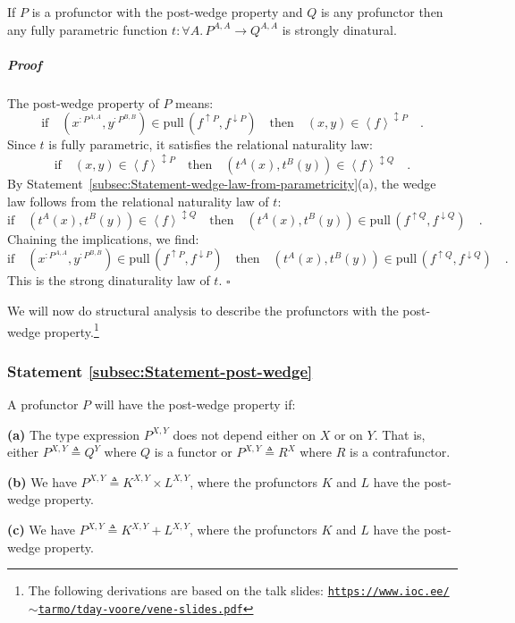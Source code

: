 If $P$ is a profunctor with the post-wedge property and $Q$ is any
profunctor then any fully parametric function $t:\forall A.\,P^{A,A}\rightarrow Q^{A,A}$
is strongly dinatural.

\subparagraph{Proof}

The post-wedge property of $P$ means:
\[
\text{if}\quad(x^{:P^{A,A}},y^{:P^{B,B}})\in\text{pull}\,(f^{\uparrow P},f^{\downarrow P})\quad\text{then}\quad(x,y)\in\left<f\right>^{\updownarrow P}\quad.
\]
Since $t$ is fully parametric, it satisfies the relational naturality
law:
\[
\text{if}\quad(x,y)\in\left<f\right>^{\updownarrow P}\quad\text{then}\quad(t^{A}(x),t^{B}(y))\in\left<f\right>^{\updownarrow Q}\quad.
\]
By Statement~\ref{subsec:Statement-wedge-law-from-parametricity}(a),
the wedge law follows from the relational naturality law of $t$:
\[
\text{if}\quad(t^{A}(x),t^{B}(y))\in\left<f\right>^{\updownarrow Q}\quad\text{then}\quad(t^{A}(x),t^{B}(y))\in\text{pull}\,(f^{\uparrow Q},f^{\downarrow Q})\quad.
\]
Chaining the implications, we find:
\[
\text{if}\quad(x^{:P^{A,A}},y^{:P^{B,B}})\in\text{pull}\,(f^{\uparrow P},f^{\downarrow P})\quad\text{then}\quad(t^{A}(x),t^{B}(y))\in\text{pull}\,(f^{\uparrow Q},f^{\downarrow Q})\quad.
\]
This is the strong dinaturality law of $t$. $\square$

We will now do structural analysis to describe the profunctors with
the post-wedge property.\footnote{The following derivations are based on the talk slides: \texttt{\href{https://www.ioc.ee/~tarmo/tday-voore/vene-slides.pdf}{https://www.ioc.ee/$\sim$tarmo/tday-voore/vene-slides.pdf}}} 

\subsubsection{Statement \label{subsec:Statement-post-wedge}\ref{subsec:Statement-post-wedge}}

A profunctor $P$ will have the post-wedge property if:

\textbf{(a)} The type expression $P^{X,Y}$ does not depend either
on $X$ or on $Y$. That is, either $P^{X,Y}\triangleq Q^{Y}$ where
$Q$ is a functor or $P^{X,Y}\triangleq R^{X}$ where $R$ is a contrafunctor. 

\textbf{(b)} We have $P^{X,Y}\triangleq K^{X,Y}\times L^{X,Y}$, where
the profunctors $K$ and $L$ have the post-wedge property.

\textbf{(c)} We have $P^{X,Y}\triangleq K^{X,Y}+L^{X,Y}$, where the
profunctors $K$ and $L$ have the post-wedge property.


